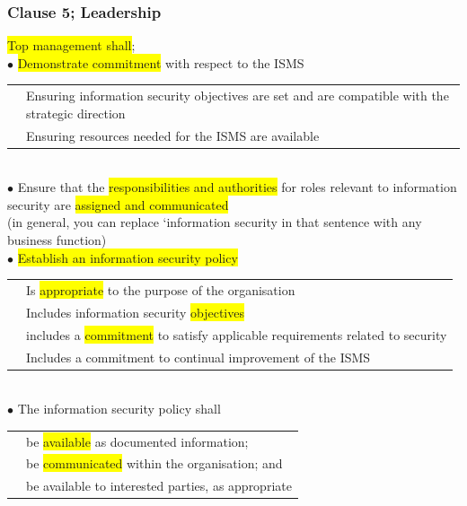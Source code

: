 \documentclass[tikz,border=10pt]{project_plan}
\newcommand{\bulletPoint}{\hspace{-3.1pt}$\bullet$ \hspace{5pt}}
\begin{document}
\newpage

\subsubsection{Clause 5; Leadership}
\colorbox{yellow}{Top management shall};\\
\bulletPoint \colorbox{yellow}{Demonstrate commitment} with respect to the ISMS\\
\begin{tabular}{r |@{\bulletPoint} l}
   & Ensuring information security objectives are set and are compatible with the strategic direction \\
   & Ensuring resources needed for the ISMS are available                                             \\
\end{tabular}\\
\bulletPoint Ensure that the \colorbox{yellow}{responsibilities and authorities} for roles relevant to information security are \colorbox{yellow}{assigned and communicated}\\ (in general, you can replace ‘information security in that sentence with any business function)\\
\bulletPoint \colorbox{yellow}{Establish an information security policy}\\
\begin{tabular}{r |@{\bulletPoint} l}
   & Is \colorbox{yellow}{appropriate} to the purpose of the organisation                            \\
   & Includes information security \colorbox{yellow}{objectives}                                     \\
   & includes a \colorbox{yellow}{commitment} to satisfy applicable requirements related to security \\
   & Includes a commitment to continual improvement of the ISMS                                      \\
\end{tabular}\\
\bulletPoint The information security policy shall\\
\begin{tabular}{r |@{\bulletPoint} l}
   & be \colorbox{yellow}{available} as documented information;      \\
   & be \colorbox{yellow}{communicated} within the organisation; and \\
   & be available to interested parties, as appropriate              \\
\end{tabular}\\
\end{document}
